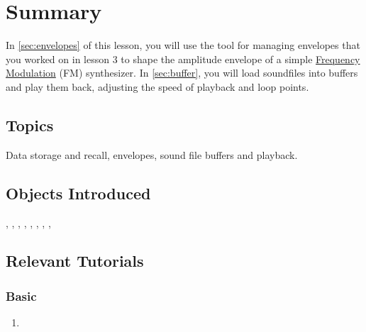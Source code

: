 

\graphicspath{{\imagedir}}

\date{\today}


\maketitle

\section*{Summary}
In \autoref{sec:envelopes} of this lesson, you will use the tool for managing 
envelopes that you worked on in lesson 3 to shape the amplitude envelope
of a simple \href{http://en.wikipedia.org/wiki/Frequency_modulation}{Frequency Modulation} (FM) 
synthesizer.  In \autoref{sec:buffer}, you will load soundfiles into
buffers and play them back, adjusting the speed of playback and loop points.

\subsection*{Topics}
Data storage and recall, envelopes, sound file buffers and playback.

\subsection*{Objects Introduced}
, , , , ,
, , , 

\subsection*{Relevant Tutorials}
\subsubsection*{Basic}
\begin{enumerate}
\item {}
\end{enumerate}
